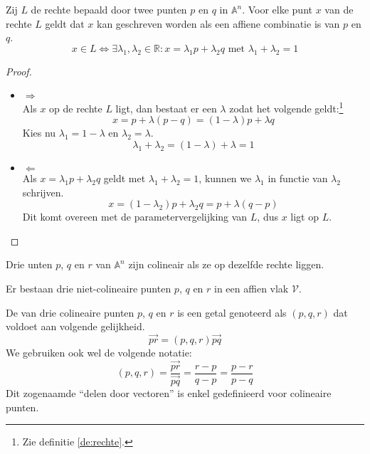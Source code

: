 \documentclass[main.tex]{subfiles}
\begin{document}
\begin{st}
  Zij $L$ de rechte bepaald door twee punten $p$ en $q$ in $\mathbb{A}^{n}$.
  Voor elke punt $x$ van de rechte $L$ geldt dat $x$ kan geschreven worden als een affiene combinatie is van $p$ en $q$.
  \[ x \in L \Leftrightarrow \exists \lambda_{1},\lambda_{2} \in \mathbb{R}: x = \lambda_{1}p + \lambda_{2}q \text{ met } \lambda_{1} + \lambda_{2} = 1 \]
  
  \begin{proof}
    \begin{itemize}
    \item $\Rightarrow$\\
      Als $x$ op de rechte $L$ ligt, dan bestaat er een $\lambda$ zodat het volgende geldt:\footnote{Zie definitie \ref{de:rechte}.}
      \[ x = p + \lambda(p - q) = (1 - \lambda)p + \lambda q \]
      Kies nu $\lambda_{1} = 1-\lambda$ en $\lambda_{2} = \lambda$.
      \[ \lambda_{1} + \lambda_{2} = (1-\lambda) + \lambda = 1 \]
    \item $\Leftarrow$\\
      Als $x = \lambda_{1}p + \lambda_{2}q$ geldt met $\lambda_{1} + \lambda_{2} = 1$, kunnen we $\lambda_{1}$ in functie van $\lambda_{2}$ schrijven.
      \[ x = (1-\lambda_{2})p + \lambda_{2}q = p + \lambda(q-p)\]
      Dit komt overeen met de parametervergelijking van $L$, dus $x$ ligt op $L$.
    \end{itemize}
  \end{proof}
\end{st}

\begin{de}
  Drie unten $p$, $q$ en $r$ van $\mathbb{A}^{n}$ zijn colineair als ze op dezelfde rechte liggen.
\end{de}

\begin{st}
  Er bestaan drie niet-colineaire punten $p$, $q$ en $r$ in een affien vlak $\mathcal{V}$.

\end{st}

\begin{de}
  De  van drie colineaire punten $p$, $q$ en $r$ is een getal genoteerd als $(p,q,r)$ dat voldoet aan volgende gelijkheid.
  \[ \vec{pr} = (p,q,r)\vec{pq} \]
  We gebruiken ook wel de volgende notatie:
  \[ (p,q,r) = \frac{\vec{pr}}{\vec{pq}} = \frac{r-p}{q-p} = \frac{p-r}{p-q} \]
  Dit zogenaamde ``delen door vectoren'' is enkel gedefinieerd voor colineaire punten.
\end{de}
\end{document}
